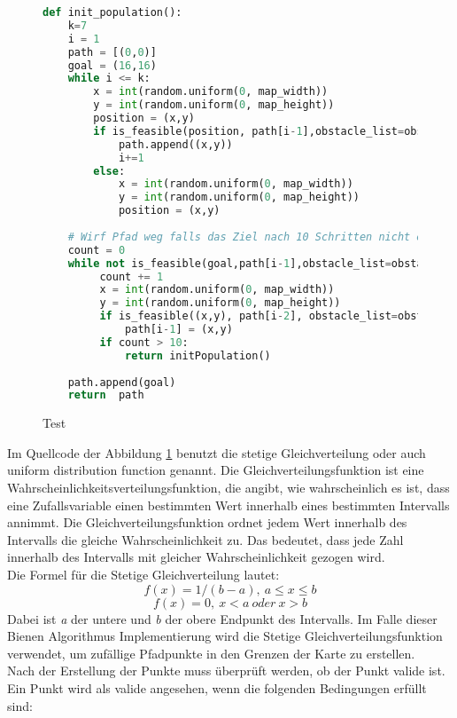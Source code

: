 \begin{figure}[H]
    \begin{lstlisting}[language=python]
def init_population():
    k=7
    i = 1
    path = [(0,0)]
    goal = (16,16)
    while i <= k:
        x = int(random.uniform(0, map_width))
        y = int(random.uniform(0, map_height))
        position = (x,y)
        if is_feasible(position, path[i-1],obstacle_list=obstacle_list):
            path.append((x,y))
            i+=1
        else: 
            x = int(random.uniform(0, map_width))
            y = int(random.uniform(0, map_height))
            position = (x,y)
            
    # Wirf Pfad weg falls das Ziel nach 10 Schritten nicht erreicht ist.
    count = 0
    while not is_feasible(goal,path[i-1],obstacle_list=obstacle_list):
         count += 1
         x = int(random.uniform(0, map_width))
         y = int(random.uniform(0, map_height))
         if is_feasible((x,y), path[i-2], obstacle_list=obstacle_list):
             path[i-1] = (x,y)
         if count > 10:
             return initPopulation()   
    
    path.append(goal)
    return  path
\end{lstlisting}
\caption{Test}
\label{fig:init}
\end{figure} 
Im Quellcode der Abbildung \ref{fig:init} benutzt die stetige Gleichverteilung oder auch uniform distribution function genannt. Die Gleichverteilungsfunktion ist eine Wahrscheinlichkeitsverteilungsfunktion, die angibt, wie wahrscheinlich es ist, dass eine Zufallsvariable einen bestimmten Wert innerhalb eines bestimmten Intervalls annimmt.
Die Gleichverteilungsfunktion ordnet jedem Wert innerhalb des Intervalls die gleiche Wahrscheinlichkeit zu. Das bedeutet, dass jede Zahl innerhalb des Intervalls mit gleicher Wahrscheinlichkeit gezogen wird.\\
Die Formel für die Stetige Gleichverteilung lautet:
\[f(x) = 1/(b-a),\: a \leq x \leq b\]
\[f(x) = 0,\:x < a \:oder\: x > b\]
Dabei ist \emph{a} der untere und \emph{b} der obere Endpunkt des Intervalls. Im Falle dieser Bienen Algorithmus Implementierung wird die Stetige Gleichverteilungsfunktion verwendet, um zufällige Pfadpunkte in den Grenzen der Karte zu erstellen.\\
Nach der Erstellung der Punkte muss überprüft werden, ob der Punkt valide ist. Ein Punkt wird als valide angesehen, wenn die folgenden Bedingungen erfüllt sind:


